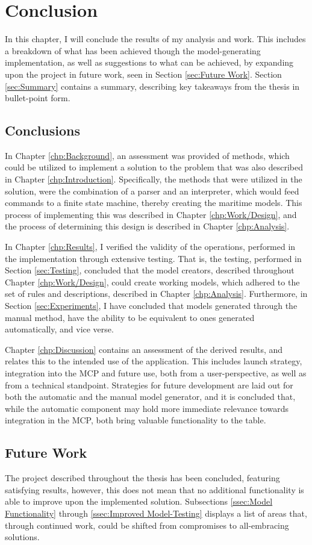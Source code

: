 \chapter{Conclusion}
In this chapter, I will conclude the results of my analysis and work. This includes a breakdown of what has been achieved though the model-generating implementation, as well as suggestions to what can be achieved, by expanding upon the project in future work, seen in Section \ref{sec:Future Work}. Section \ref{sec:Summary} contains a summary, describing key takeaways from the thesis in bullet-point form.
\section{Conclusions}
In Chapter \ref{chp:Background}, an assessment was provided of methods, which could be utilized to implement a solution to the problem that was also described in Chapter \ref{chp:Introduction}. Specifically, the methods that were utilized in the solution, were the combination of a parser and an interpreter, which would feed commands to a finite state machine, thereby creating the maritime models. This process of implementing this was described in Chapter \ref{chp:Work/Design}, and the process of determining this design is described in Chapter \ref{chp:Analysis}.

In Chapter \ref{chp:Results}, I verified the validity of the operations, performed in the implementation through extensive testing. That is, the testing, performed in Section \ref{sec:Testing}, concluded that the model creators, described throughout Chapter \ref{chp:Work/Design}, could create working models, which adhered to the set of rules and descriptions, described in Chapter \ref{chp:Analysis}. Furthermore, in Section \ref{sec:Experiments}, I have concluded that models generated through the manual method, have the ability to be equivalent to ones generated automatically, and vice verse.

Chapter \ref{chp:Discussion} contains an assessment of the derived results, and relates this to the intended use of the application. This includes launch strategy, integration into the MCP and future use, both from a user-perspective, as well as from a technical standpoint. Strategies for future development are laid out for both the automatic and the manual model generator, and it is concluded that, while the automatic component may hold more immediate relevance towards integration in the MCP, both bring valuable functionality to the table.
\section{Future Work}
The project described throughout the thesis has been concluded, featuring satisfying results, however, this does not mean that no additional functionality is able to improve upon the implemented solution. Subsections \ref{ssec:Model Functionality} through \ref{ssec:Improved Model-Testing} displays a list of areas that, through continued work, could be shifted from compromises to all-embracing solutions.
